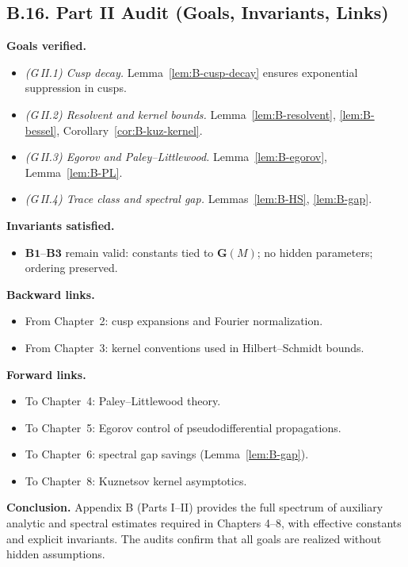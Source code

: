 \bigskip
\subsection*{B.16. Part II Audit (Goals, Invariants, Links)}

\noindent\textbf{Goals verified.}
\begin{itemize}
  \item \emph{(G\,II.1) Cusp decay.} Lemma~\ref{lem:B-cusp-decay} ensures exponential suppression in cusps.
  \item \emph{(G\,II.2) Resolvent and kernel bounds.} Lemma~\ref{lem:B-resolvent}, \ref{lem:B-bessel}, Corollary~\ref{cor:B-kuz-kernel}.
  \item \emph{(G\,II.3) Egorov and Paley–Littlewood.} Lemma~\ref{lem:B-egorov}, Lemma~\ref{lem:B-PL}.
  \item \emph{(G\,II.4) Trace class and spectral gap.} Lemmas~\ref{lem:B-HS}, \ref{lem:B-gap}.
\end{itemize}

\noindent\textbf{Invariants satisfied.}
\begin{itemize}
  \item \(\mathbf{B1}\)–\(\mathbf{B3}\) remain valid: constants tied to \(\mathbf{G}(M)\); no hidden parameters; ordering preserved.
\end{itemize}

\noindent\textbf{Backward links.}
\begin{itemize}
  \item From Chapter~2: cusp expansions and Fourier normalization.
  \item From Chapter~3: kernel conventions used in Hilbert–Schmidt bounds.
\end{itemize}

\noindent\textbf{Forward links.}
\begin{itemize}
  \item To Chapter~4: Paley–Littlewood theory.
  \item To Chapter~5: Egorov control of pseudodifferential propagations.
  \item To Chapter~6: spectral gap savings (Lemma~\ref{lem:B-gap}).
  \item To Chapter~8: Kuznetsov kernel asymptotics.
\end{itemize}

\bigskip
\noindent\textbf{Conclusion.}
Appendix B (Parts I–II) provides the full spectrum of auxiliary analytic and spectral estimates required in Chapters 4–8, with effective constants and explicit invariants. The audits confirm that all goals are realized without hidden assumptions.

